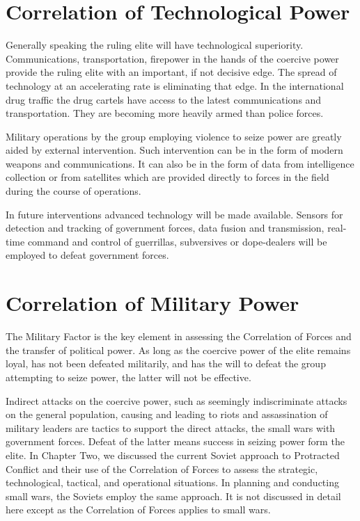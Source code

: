 \section{Correlation of Technological Power}
Generally speaking the ruling elite will have technological superiority. Communications, transportation, firepower in the hands of the coercive power provide the ruling elite with an important, if not decisive edge. The spread of technology at an accelerating rate is eliminating that edge. In the international drug traffic the drug cartels have access to the latest communications and transportation. They are becoming more heavily armed than police forces.

Military operations by the group employing violence to seize power are greatly aided by external intervention. Such intervention can be in the form of modern weapons and communications. It can also be in the form of data from intelligence collection or from satellites which are provided directly to forces in the field during the course of operations.

In future interventions advanced technology will be made available. Sensors for detection and tracking of government forces, data fusion and transmission, real-time command and control of guerrillas, subversives or dope-dealers will be employed to defeat government forces.

\section{Correlation of Military Power}
The Military Factor is the key element in assessing the Correlation of Forces and the transfer of political power. As long as the coercive power of the elite remains loyal, has not been defeated militarily, and has the will to defeat the group attempting to seize power, the latter will not be effective.

Indirect attacks on the coercive power, such as seemingly indiscriminate attacks on the general population, causing and leading to riots and assassination of military leaders are tactics to support the direct attacks, the small wars with government forces. Defeat of the latter means success in seizing power form the elite. In Chapter Two, we discussed the current Soviet approach to Protracted Conflict and their use of the Correlation of Forces to assess the strategic, technological, tactical, and operational situations. In planning and conducting small wars, the Soviets employ the same approach. It is not discussed in detail here except as the Correlation of Forces applies to small wars.


